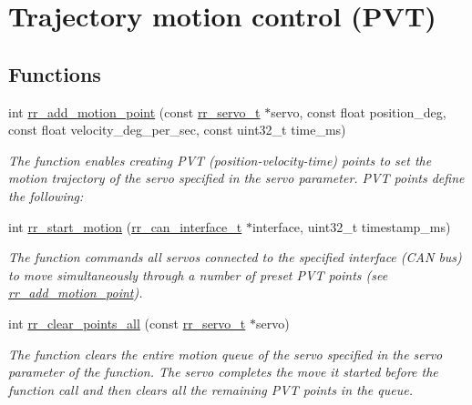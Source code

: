 \hypertarget{group___trajectory}{}\section{Trajectory motion control (P\+VT)}
\label{group___trajectory}
\subsection*{Functions}
\begin{DoxyCompactItemize}
\item 
int \hyperlink{group___trajectory_gaba5ac04eeadd4a8d888b409f34837ece}{rr\+\_\+add\+\_\+motion\+\_\+point} (const \hyperlink{structrr__servo__t}{rr\+\_\+servo\+\_\+t} $\ast$servo, const float position\+\_\+deg, const float velocity\+\_\+deg\+\_\+per\+\_\+sec, const uint32\+\_\+t time\+\_\+ms)
\begin{DoxyCompactList}\small\item\em The function enables creating P\+VT (position-\/velocity-\/time) points to set the motion trajectory of the servo specified in the \textquotesingle{}servo\textquotesingle{} parameter. P\+VT points define the following\+:~\newline
 \end{DoxyCompactList}\item 
int \hyperlink{group___trajectory_gaeb3f167be0e7caf96d4cb4b648d3a548}{rr\+\_\+start\+\_\+motion} (\hyperlink{structrr__can__interface__t}{rr\+\_\+can\+\_\+interface\+\_\+t} $\ast$interface, uint32\+\_\+t timestamp\+\_\+ms)
\begin{DoxyCompactList}\small\item\em The function commands all servos connected to the specified interface (C\+AN bus) to move simultaneously through a number of preset P\+VT points (see \hyperlink{group___trajectory_gaba5ac04eeadd4a8d888b409f34837ece}{rr\+\_\+add\+\_\+motion\+\_\+point}).~\newline
 \end{DoxyCompactList}\item 
int \hyperlink{group___trajectory_ga19472cd90ae91f9b9f49edf4f52f35a2}{rr\+\_\+clear\+\_\+points\+\_\+all} (const \hyperlink{structrr__servo__t}{rr\+\_\+servo\+\_\+t} $\ast$servo)
\begin{DoxyCompactList}\small\item\em The function clears the entire motion queue of the servo specified in the \textquotesingle{}servo\textquotesingle{} parameter of the function. The servo completes the move it started before the function call and then clears all the remaining P\+VT points in the queue. \end{DoxyCompactList}\item 

\end{DoxyCompactItemize}
